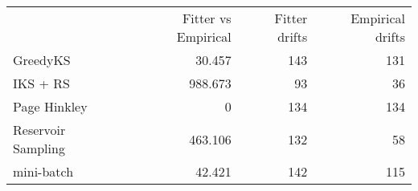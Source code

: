 \begin{tabular}{lrrr}
 & Fitter vs Empirical & Fitter drifts & Empirical drifts \\
GreedyKS & 30.457 & 143 & 131 \\
IKS + RS & 988.673 & 93 & 36 \\
Page Hinkley & 0 & 134 & 134 \\
Reservoir Sampling & 463.106 & 132 & 58 \\
mini-batch & 42.421 & 142 & 115 \\
\end{tabular}
